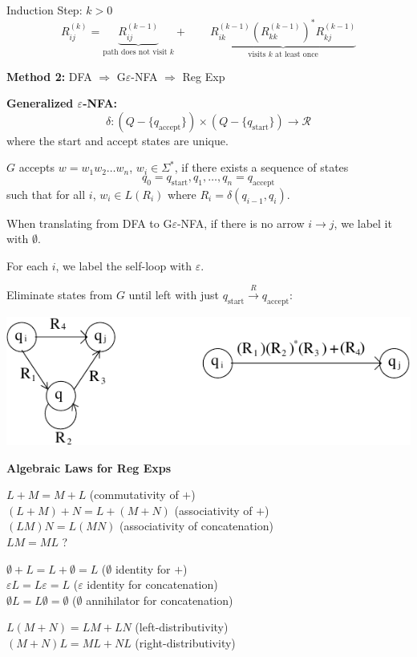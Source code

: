 \begin{frame}
Induction Step: $k>0$ 
$$
R_{ij}^{(k)}=\underbrace{R_{ij}^{(k-1)}}_{\text{path does not visit $k$}}
+\qquad
\underbrace{R_{ik}^{(k-1)}\left(R_{kk}^{(k-1)}\right)^*
R_{kj}^{(k-1)}}_{\text{visits $k$ at least once}}
$$

{\bf Method 2:}
DFA $\Longrightarrow$ G$\varepsilon$-NFA $\Longrightarrow$ Reg Exp

{\bf Generalized $\varepsilon$-NFA:} 
$$
\delta:(Q-\{q_{\text{accept}}\})\times
(Q-\{q_{\text{start}}\})\longrightarrow\mathcal{R}
$$
where the start and accept states are unique.  

$G$ accepts $w=w_1w_2\ldots w_n$, \underline{$w_i\in\Sigma^*$}, if
there exists a sequence of states
$$
q_0=q_{\text{start}},q_1,\ldots,q_n=q_{\text{accept}}
$$ 
such that for all $i$, $w_i\in L(R_i)$ where
$R_i=\delta(q_{i-1},q_i)$.
\end{frame}

\begin{frame}
When translating from DFA to G$\varepsilon$-NFA, if there is no arrow
$i\longrightarrow j$, we label it with $\emptyset$.  

For each $i$, we label the self-loop with $\varepsilon$.

Eliminate states from $G$ until left with just
$q_{\text{start}}\stackrel{R}{\longrightarrow}q_{\text{accept}}$:

\begin{center}
\includegraphics{figures/6.pdf}
\end{center}
\end{frame}

\begin{frame}

{\bf Algebraic Laws for Reg Exps}

$L+M=M+L$ (commutativity of $+$)\\
$(L+M)+N=L+(M+N)$ (associativity of $+$)\\
$(LM)N=L(MN)$ (associativity of concatenation) \\
$LM=ML$ ?

\bigskip

$\emptyset+L=L+\emptyset=L$ ($\emptyset$ identity for $+$) \\
$\varepsilon L=L\varepsilon=L$ ($\varepsilon$ identity for
concatenation) \\
$\emptyset L=L\emptyset =\emptyset$ ($\emptyset$ annihilator for
concatenation)

\bigskip

$L(M+N)=LM+LN$ (left-distributivity) \\
$(M+N)L=ML+NL$ (right-distributivity)
\end{frame}

